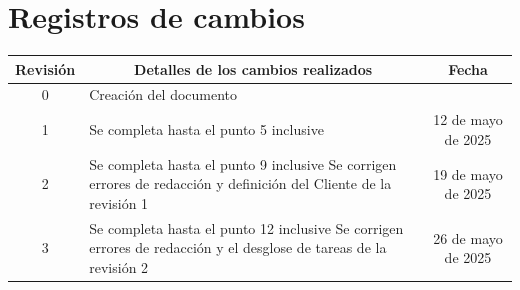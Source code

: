 \documentclass[
11pt, %
]{charter}
\begin{document}
\maketitle
\thispagestyle{empty}
\pagebreak


\thispagestyle{empty}
{\setlength{\parskip}{0pt}
\tableofcontents{}
}
\pagebreak


\section*{Registros de cambios}
\label{sec:registro}


\begin{table}[ht]
\label{tab:registro}
\centering
\begin{tabularx}{\linewidth}{@{}|c|X|c|@{}}
\hline
\rowcolor[HTML]{C0C0C0} 
Revisión & \multicolumn{1}{c|}{\cellcolor[HTML]{C0C0C0}Detalles de los cambios realizados} & Fecha	\\ \hline
0      & Creación del documento                                 &\fechaInicioName					\\ \hline
1      & Se completa hasta el punto 5 inclusive                 & {12} de {mayo} de 2025			\\ \hline
2      & Se completa hasta el punto 9 inclusive \newline Se corrigen errores de redacción y definición del Cliente de la revisión 1	& {19} de {mayo} de 2025			\\ \hline
3      & Se completa hasta el punto 12 inclusive \newline Se corrigen errores de redacción y el desglose de tareas de la revisión 2	& {26} de {mayo} de 2025			\\ \hline


\end{tabularx}
\end{table}
\end{document}

